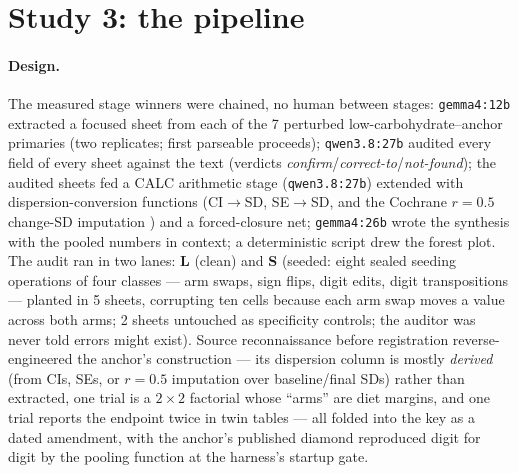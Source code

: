 \documentclass[11pt]{article}
\begin{document}
\section{Study 3: the pipeline}\label{sec:study3}

\paragraph{Design.} The measured stage winners were chained, no human between stages: \texttt{gemma4:12b} extracted a focused sheet from each of the 7 perturbed low-carbohydrate--anchor primaries (two replicates; first parseable proceeds); \texttt{qwen3.8:27b} audited every field of every sheet against the text (verdicts \emph{confirm}/\emph{correct-to}/\emph{not-found}); the audited sheets fed a CALC arithmetic stage (\texttt{qwen3.8:27b}) extended with dispersion-conversion functions (CI$\to$SD, SE$\to$SD, and the Cochrane $r{=}0.5$ change-SD imputation \citep{higgins2023handbook}) and a forced-closure net; \texttt{gemma4:26b} wrote the synthesis with the pooled numbers in context; a deterministic script drew the forest plot. The audit ran in two lanes: \textbf{L} (clean) and \textbf{S} (seeded: eight sealed seeding operations of four classes --- arm swaps, sign flips, digit edits, digit transpositions --- planted in 5 sheets, corrupting ten cells because each arm swap moves a value across both arms; 2 sheets untouched as specificity controls; the auditor was never told errors might exist). Source reconnaissance before registration reverse-engineered the anchor's construction --- its dispersion column is mostly \emph{derived} (from CIs, SEs, or $r{=}0.5$ imputation over baseline/final SDs) rather than extracted, one trial is a $2{\times}2$ factorial whose ``arms'' are diet margins, and one trial reports the endpoint twice in twin tables --- all folded into the key as a dated amendment, with the anchor's published diamond reproduced digit for digit by the pooling function at the harness's startup gate.
\end{document}
